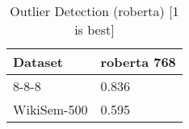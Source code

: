 \begin{table}[]
\centering
\begin{tabular}{l|l}
\hline
Dataset & roberta 768 \\
\hline
8-8-8 & 0.836 \\ 
WikiSem-500 & 0.595
\end{tabular}
\caption{Outlier Detection (roberta) [1 is best]}
\label{tab:outlier-roberta}
\end{table}
